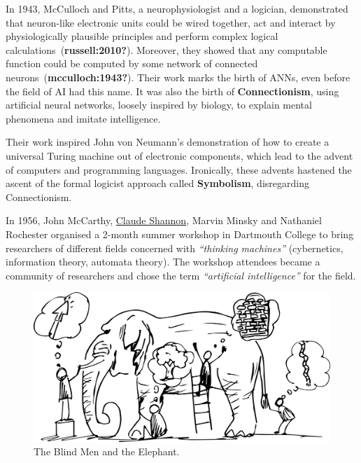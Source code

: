 \documentclass[
  letterpaper,
  DIV=11,
  numbers=noendperiod,
  oneside]{scrreprt}
\begin{document}
In 1943, McCulloch and Pitts, a neurophysiologist and a logician,
demonstrated that neuron-like electronic units could be wired together,
act and interact by physiologically plausible principles and perform
complex logical calculations~(\textbf{russell:2010?}). Moreover, they
showed that any computable function could be computed by some network of
connected neurons~(\textbf{mcculloch:1943?}). Their work marks the birth
of {ANNs}, even before the field of AI had this name. It was also the
birth of \textbf{Connectionism}, using artificial neural networks,
loosely inspired by biology, to explain mental phenomena and imitate
intelligence.

Their work inspired John von Neumann's demonstration of how to create a
universal Turing machine out of electronic components, which lead to the
advent of computers and programming languages. Ironically, these advents
hastened the ascent of the formal logicist approach called
\textbf{Symbolism}, disregarding Connectionism.

In 1956, John McCarthy, \protect\hyperlink{fig-shannon}{Claude Shannon},
Marvin Minsky and Nathaniel Rochester organised a 2-month summer
workshop in Dartmouth College to bring researchers of different fields
concerned with \emph{``thinking machines''} (cybernetics, information
theory, automata theory). The workshop attendees became a community of
researchers and chose the term \emph{``artificial intelligence''} for
the field.

\begin{figure}

{\centering \includegraphics{imgs/elephant.png}

}

\caption{The Blind Men and the Elephant.}

\end{figure}
\end{document}
